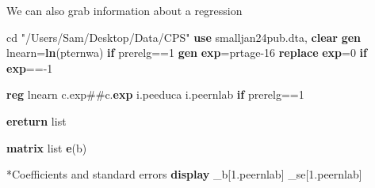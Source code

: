 \documentclass[
]{book}
\newenvironment{Shaded}{\begin{snugshade}}{\end{snugshade}}
\newcommand{\FunctionTok}[1]{\textcolor[rgb]{0.13,0.29,0.53}{\textbf{#1}}}
\newcommand{\KeywordTok}[1]{\textcolor[rgb]{0.13,0.29,0.53}{\textbf{#1}}}
\newcommand{\NormalTok}[1]{#1}
\newcommand{\OtherTok}[1]{\textcolor[rgb]{0.56,0.35,0.01}{#1}}
\newcommand{\StringTok}[1]{\textcolor[rgb]{0.31,0.60,0.02}{#1}}
\begin{document}
We can also grab information about a regression

\begin{Shaded}
\begin{Highlighting}[]
\NormalTok{cd }\StringTok{"/Users/Sam/Desktop/Data/CPS"}
\KeywordTok{use}\NormalTok{ smalljan24pub.dta, }\KeywordTok{clear}
\KeywordTok{gen}\NormalTok{ lnearn=}\FunctionTok{ln}\NormalTok{(pternwa) }\KeywordTok{if}\NormalTok{ prerelg==1}
\KeywordTok{gen} \FunctionTok{exp}\NormalTok{=prtage{-}16}
\KeywordTok{replace} \FunctionTok{exp}\NormalTok{=0 }\KeywordTok{if} \FunctionTok{exp}\NormalTok{=={-}1}

\KeywordTok{reg}\NormalTok{ lnearn c.exp\#\#c.}\FunctionTok{exp}\NormalTok{ i.peeduca i.peernlab }\KeywordTok{if}\NormalTok{ prerelg==1}

\KeywordTok{ereturn} \OtherTok{list}

\FunctionTok{matrix} \OtherTok{list} \FunctionTok{e}\NormalTok{(b)}

\NormalTok{*Coefficients and standard errors}
\KeywordTok{display}\NormalTok{ \_b[1.peernlab] \_se[1.peernlab]}
\end{Highlighting}
\end{Shaded}
\end{document}
